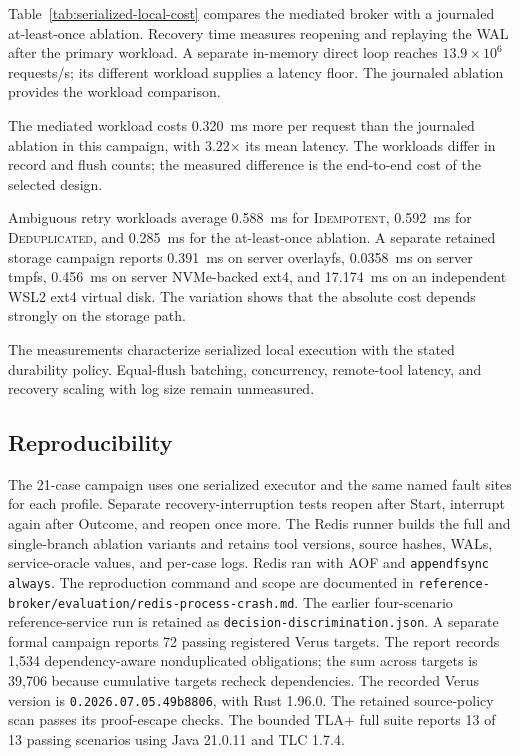 \documentclass[acmsmall,screen,review,anonymous]{acmart}
\newcommand{\Idempotent}{\textsc{Idempotent}\xspace}
\newcommand{\Deduplicated}{\textsc{Deduplicated}\xspace}
\begin{document}
Table~\ref{tab:serialized-local-cost} compares the mediated
broker with a journaled at-least-once ablation. Recovery time measures
reopening and replaying the WAL after the primary workload. A separate
in-memory direct loop reaches $13.9\times10^6$ requests/s; its different
workload supplies a latency floor. The journaled ablation provides the
workload comparison.

The mediated workload costs 0.320~ms more per request than the
journaled ablation in this campaign, with 3.22$\times$ its mean latency.
The workloads differ in record and flush counts; the measured difference
is the end-to-end cost of the selected design.

Ambiguous retry workloads average 0.588~ms for \Idempotent,
0.592~ms for \Deduplicated, and 0.285~ms for the at-least-once
ablation. A separate retained storage campaign reports 0.391~ms on
server overlayfs, 0.0358~ms on server tmpfs, 0.456~ms on server
NVMe-backed ext4, and 17.174~ms on an independent WSL2 ext4 virtual
disk. The variation shows that the absolute cost depends strongly
on the storage path.

The measurements characterize serialized local execution with the stated
durability policy. Equal-flush batching, concurrency, remote-tool latency,
and recovery scaling with log size remain unmeasured.

\subsection{Reproducibility}

The 21-case campaign uses one serialized executor and the same named
fault sites for each profile. Separate recovery-interruption tests
reopen after Start, interrupt again after Outcome, and reopen once
more. The Redis runner builds the full and single-branch ablation variants
and retains tool versions, source hashes, WALs, service-oracle values, and
per-case logs. Redis ran with AOF and \texttt{appendfsync always}.
The reproduction command and scope are documented in
\texttt{reference-broker/evaluation/redis-process-crash.md}.
The earlier four-scenario reference-service run is retained as
\texttt{decision-discrimination.json}. A separate formal campaign reports
72 passing registered Verus targets. The report records 1,534
dependency-aware nonduplicated obligations; the sum across targets is
39,706 because cumulative targets recheck dependencies. The recorded
Verus version is \texttt{0.2026.07.05.49b8806}, with Rust 1.96.0.
The retained source-policy scan passes its proof-escape checks.
The bounded TLA+ full suite reports 13 of 13 passing scenarios using
Java 21.0.11 and TLC 1.7.4.
\end{document}
